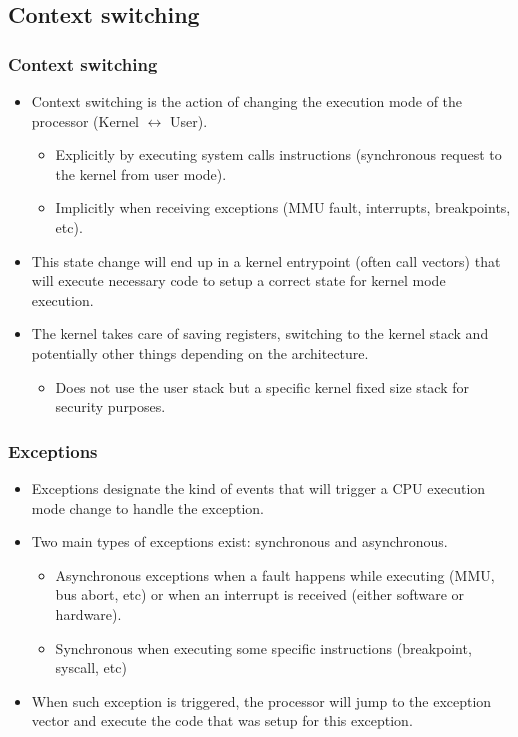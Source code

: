 

\subsection{Context switching}

\begin{frame}
  \frametitle{Context switching}
  \begin{itemize}
    \item Context switching is the action of changing the execution mode of the
          processor (Kernel $\leftrightarrow$ User).
    \begin{itemize}
      \item Explicitly by executing system calls instructions (synchronous
            request to the kernel from user mode).
      \item Implicitly when receiving exceptions (MMU fault, interrupts,
            breakpoints, etc).
    \end{itemize}
    \item This state change will end up in a kernel entrypoint (often call vectors)
          that will execute necessary code to setup a correct state for kernel
          mode execution.
    \item The kernel takes care of saving registers, switching to the kernel
          stack and potentially other things depending on the architecture.
    \begin{itemize}
      \item Does not use the user stack but a specific kernel fixed size stack
            for security purposes.
    \end{itemize}
  \end{itemize}
\end{frame}

\begin{frame}
  \frametitle{Exceptions}
  \begin{itemize}
    \item Exceptions designate the kind of events that will trigger a CPU
          execution mode change to handle the exception.
    \item Two main types of exceptions exist: synchronous and asynchronous.
    \begin{itemize}
      \item Asynchronous exceptions when a fault happens while executing (MMU,
            bus abort, etc) or when an interrupt is received (either software
            or hardware).
      \item Synchronous when executing some specific instructions (breakpoint,
            syscall, etc)
    \end{itemize}
    \item When such exception is triggered, the processor will jump to the
          exception vector and execute the code that was setup for this
          exception.
  \end{itemize}
\end{frame}

